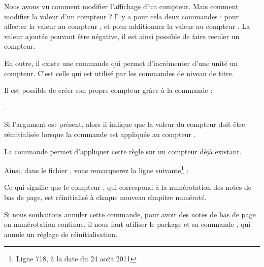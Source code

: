 Nous avons vu comment modifier l'affichage d'un compteur. Mais comment modifier la valeur d'un compteur ? Il y a pour cela deux commandes :  pour affecter la valeur  au compteur , et  pour additionner la valeur  au compteur . La valeur ajoutée pouvant être négative, il est ainsi possible de faire reculer un compteur.

En outre, il existe une commande  qui permet d'incrémenter d'une unité un compteur. C'est celle qui est utilisé par les commandes de niveau de titre.



Il est possible de créer son propre compteur grâce à la commande :

 . 
 
Si l'argument  est présent, alors il indique que la valeur du compteur  doit être réinitialisée lorsque la commande  est appliquée au compteur .

La commande    permet d'appliquer cette règle sur un compteur déjà existant.

Ainsi, dans le fichier , vous remarquerez la ligne suivante\footnote{Ligne 718, à la date du 24 août 2011}  :

\begin{latexcode}
\end{latexcode} 

Ce qui signifie que le compteur  , qui correspond à la numérotation des notes de bas de page, est réinitialisé à chaque nouveau chapitre numéroté. 

Si nous souhaitons annuler cette commande, pour avoir des notes de bas de page en numérotation continue, il nous faut utiliser le package  et sa commande , qui annule un réglage de réinitialisation.

\begin{latexcode}
\usepackage{remreset}
\makeatletter
{}
\makeatother
\end{latexcode}
